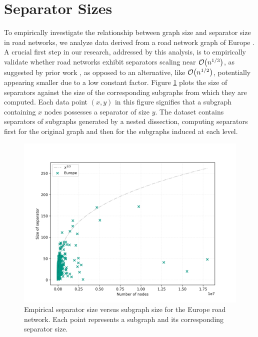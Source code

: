 \section{Separator Sizes}
\label{sec:empirical_analysis}

To empirically investigate the relationship between graph size and separator size in road networks, we analyze data derived from a road network graph of Europe \cite{ptv_group_dimacs-europe_2009}.
A crucial first step in our research, addressed by this analysis, is to empirically validate whether road networks exhibit separators scaling near \(\mathcal{O}\!\left(n^{1/3}\right)\), as suggested by prior work \cite{dibbelt_customizable_2016}, as opposed to an alternative, like \(\mathcal{O}\!\left(n^{1/2}\right)\), potentially appearing smaller due to a low constant factor.
Figure \cref{fig:separator_size_vs_graph_size} plots the size of separators against the size of the corresponding subgraphs from which they are computed.
Each data point \( (x, y) \) in this figure signifies that a subgraph containing \( x \) nodes possesses a separator of size \( y \).
The dataset contains separators of subgraphs generated by a nested dissection, computing separators first for the original graph and then for the subgraphs induced at each level.

\begin{figure}[tbhp]
	\centering
	\includegraphics[width=0.7\linewidth]{graphics/Europe.png}
	\caption{Empirical separator size versus subgraph size for the Europe road network. Each point represents a subgraph and its corresponding separator size.}
	\label{fig:separator_size_vs_graph_size}
\end{figure}


